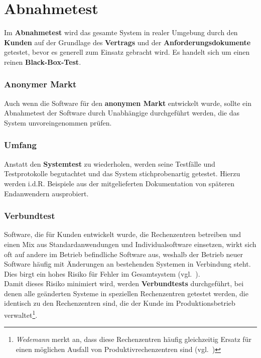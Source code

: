 \section{Abnahmetest}

\begin{tcolorbox}[title=Abnahmetest]
Im \textbf{Abnahmetest} wird das gesamte System in realer Umgebung durch den \textbf{Kunden} auf der Grundlage des \textbf{Vertrags} und der \textbf{Anforderungsdokumente} getestet, bevor es generell zum Einsatz gebracht wird. Es handelt sich um einen reinen \textbf{Black-Box-Test}.
\end{tcolorbox}

\subsubsection*{Anonymer Markt}
Auch wenn die Software für den \textbf{anonymen Markt} entwickelt wurde, sollte ein Abnahmetest der Software durch Unabhängige durchgeführt werden, die das System unvoreingenommen prüfen.

\subsubsection*{Umfang}
Anstatt den \textbf{Systemtest} zu wiederholen, werden seine Testfälle und Testprotokolle begutachtet und das System stichprobenartig getestet.
Hierzu werden i.d.R. Beispiele aus der mitgelieferten Dokumentation von späteren Endanwendern ausprobiert.

\subsubsection*{Verbundtest}
Software, die für Kunden entwickelt wurde, die Rechenzentren betreiben und einen Mix aus Standardanwendungen und Individualsoftware einsetzen, wirkt sich oft auf andere im Betrieb befindliche Software aus, weshalb der Betrieb neuer Software häufig mit Änderungen an bestehenden Systemen in Verbindung steht.\\
Dies birgt ein hohes Risiko für Fehler im Gesamtsystem (vgl.~\cite[65]{Wed09c}).\\
Damit dieses Risiko minimiert wird, werden \textbf{Verbundtests} durchgeführt, bei denen alle geänderten Systeme in speziellen Rechenzentren getestet werden, die identisch zu den Rechenzentren sind, die der Kunde im Produktionsbetrieb verwaltet\footnote{
    \textit{Wedemann} merkt an, dass diese Rechenzentren häufig gleichzeitig Ersatz für einen möglichen Ausfall von Produktivrechenzentren sind (vgl.~\cite[65]{Wed09c})
}.

